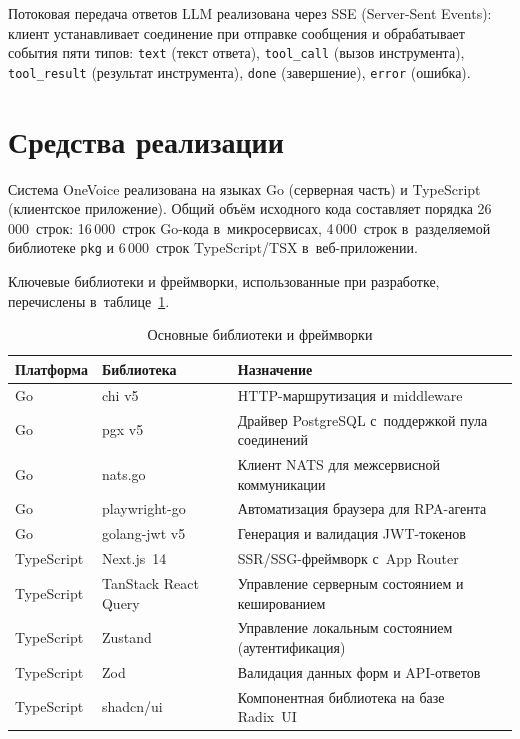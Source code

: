 Потоковая передача ответов LLM реализована через SSE (Server-Sent Events): клиент устанавливает соединение при отправке сообщения и обрабатывает события пяти типов: \texttt{text} (текст ответа), \texttt{tool\_call} (вызов инструмента), \texttt{tool\_result} (результат инструмента), \texttt{done} (завершение), \texttt{error} (ошибка).


\section{Средства реализации}
\label{sec:tech-impl}

Система OneVoice реализована на языках Go (серверная часть) и TypeScript (клиентское приложение). Общий объём исходного кода составляет порядка 26\,000~строк: 16\,000~строк Go-кода в~микросервисах, 4\,000~строк в~разделяемой библиотеке \texttt{pkg} и 6\,000~строк TypeScript/TSX в~веб-приложении.

Ключевые библиотеки и фреймворки, использованные при разработке, перечислены в~таблице~\ref{tab:libs}.

\begin{table}[H]
  \caption{Основные библиотеки и фреймворки}
  \label{tab:libs}
  \small
  \begin{tabularx}{\textwidth}{|p{2.5cm}|p{3.5cm}|X|}
    \hline
    \textbf{Платформа} & \textbf{Библиотека} & \textbf{Назначение} \\
    \hline
    Go & chi v5 & HTTP-маршрутизация и middleware \\
    \hline
    Go & pgx v5 & Драйвер PostgreSQL с~поддержкой пула соединений \\
    \hline
    Go & nats.go & Клиент NATS для межсервисной коммуникации \\
    \hline
    Go & playwright-go & Автоматизация браузера для RPA-агента \\
    \hline
    Go & golang-jwt v5 & Генерация и валидация JWT-токенов \\
    \hline
    TypeScript & Next.js~14 & SSR/SSG-фреймворк с~App Router \\
    \hline
    TypeScript & TanStack React Query & Управление серверным состоянием и кешированием \\
    \hline
    TypeScript & Zustand & Управление локальным состоянием (аутентификация) \\
    \hline
    TypeScript & Zod & Валидация данных форм и API-ответов \\
    \hline
    TypeScript & shadcn/ui & Компонентная библиотека на базе Radix~UI \\
    \hline
  \end{tabularx}
\end{table}

